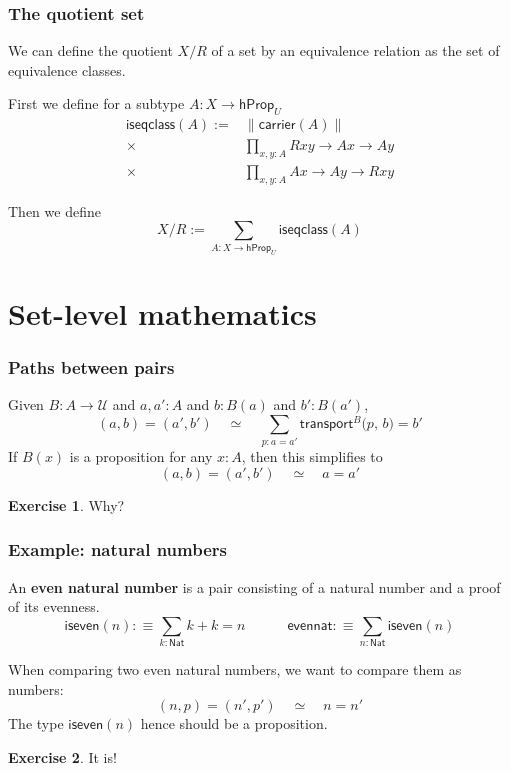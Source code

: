 \documentclass{beamer}
\newcommand{\fat}[1]{\textbf{#1}}
\newcommand{\constfont}[1]{\ensuremath{\mathsf{#1}}}
\newcommand{\U}{\mathcal{U}}
\newcommand{\Nat}{\constfont{Nat}}
\newcommand{\hProp}{\constfont{hProp}}
\newcommand{\carrier}{\constfont{carrier}}
\newcommand{\Transfib}[3]{\ensuremath{\mathsf{transport}^{#1}\Big(#2,\, #3\Big)\xspace}}
\theoremstyle{definition}
\newtheorem{exercise}{Exercise}
\begin{document}
\begin{frame}
  \frametitle{The quotient set}
  We can define the quotient $X/R$ of a set by an equivalence relation as the set of equivalence classes.\pause

  First we define for a subtype $A:X\to\hProp_U$
  \[
    \begin{split}
    \constfont{iseqclass}(A) :=
    &\left\lVert\carrier(A)\right\rVert\\
    \times&\prod_{x,y:A} R x y \to A x \to A y\\
    \times&\prod_{x,y:A} A x \to A y \to R x y
    \end{split}
  \]\pause

  Then we define
  \[
    X/R := \sum_{A:X\to\hProp_U}\constfont{iseqclass}(A)
  \]
\end{frame}

\section{Set-level mathematics}

\begin{frame}
 \frametitle{Paths between pairs}

  Given $B : A \to \U$ and $a,a' : A$ and $b : B(a)$ and $b' : B(a')$,
    \[ (a,b) = (a',b') \quad \simeq \quad \sum_{p : a = a'} \Transfib{B}{p}{b} = b' \]
  If $B(x)$ is a proposition for any $x:A$, then this simplifies to
  \[ (a,b) = (a',b') \quad \simeq \quad a = a' \]\pause

  \begin{exercise}
    Why?
  \end{exercise}
\end{frame}

\begin{frame}
 \frametitle{Example: natural numbers}

  An \fat{even natural number} is a pair consisting of a natural number and a proof of its evenness.
  \[
    \constfont{iseven}(n):\equiv\sum_{k:\Nat}k+k=n\quad\quad\quad
    \constfont{evennat}:\equiv\sum_{n:\Nat}\constfont{iseven}(n)
  \]\pause

  When comparing two even natural numbers, we want to compare them as numbers:
  \[  (n, p) = (n',p') \quad \simeq \quad n = n' \]\pause
  The type $\constfont{iseven}(n)$ hence should be a proposition.\pause
  \begin{exercise}
    It is!
  \end{exercise}

\end{frame}
\end{document}
